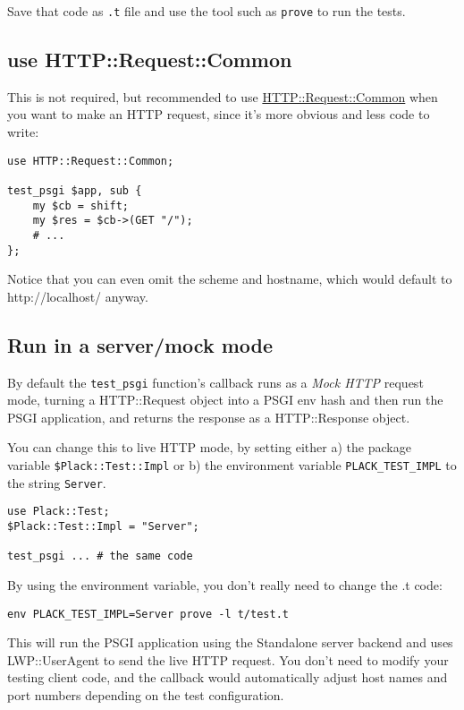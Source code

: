 Save that code as \lstinline!.t! file and use the tool such as
\lstinline!prove! to run the tests.

\subsection{use HTTP::Request::Common}\label{use-httprequestcommon}

This is not required, but recommended to use
\href{http://search.cpan.org/perldoc?HTTP::Request::Common}{HTTP::Request::Common}
when you want to make an HTTP request, since it's more obvious and less
code to write:

\begin{lstlisting}
use HTTP::Request::Common;

test_psgi $app, sub {
    my $cb = shift;
    my $res = $cb->(GET "/");
    # ...
};
\end{lstlisting}

Notice that you can even omit the scheme and hostname, which would
default to http://localhost/ anyway.

\subsection{Run in a server/mock mode}\label{run-in-a-servermock-mode}

By default the \lstinline!test_psgi! function's callback runs as a
\emph{Mock HTTP} request mode, turning a HTTP::Request object into a
PSGI env hash and then run the PSGI application, and returns the
response as a HTTP::Response object.

You can change this to live HTTP mode, by setting either a) the package
variable \lstinline!$Plack::Test::Impl! or b) the environment variable
\lstinline!PLACK_TEST_IMPL! to the string \lstinline!Server!.

\begin{lstlisting}
use Plack::Test;
$Plack::Test::Impl = "Server";

test_psgi ... # the same code
\end{lstlisting}

By using the environment variable, you don't really need to change the
.t code:

\begin{lstlisting}
env PLACK_TEST_IMPL=Server prove -l t/test.t
\end{lstlisting}

This will run the PSGI application using the Standalone server backend
and uses LWP::UserAgent to send the live HTTP request. You don't need to
modify your testing client code, and the callback would automatically
adjust host names and port numbers depending on the test configuration.

